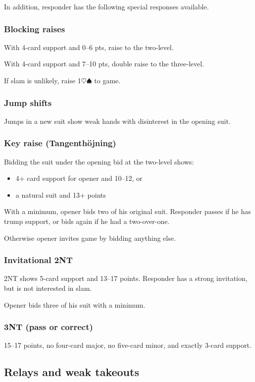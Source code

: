 \documentclass[a4paper, twoside, 11pt]{article}
\begin{document}
\begin{multicols}{3}
In addition, responder has the following special responses available.

\subsubsection*{Blocking raises}

With 4-card support and 0--6 pts, raise to the two-level.

With 4-card support and 7--10 pts, double raise to the three-level.

If slam is unlikely, raise 1$\heartsuit\spadesuit$ to game.

\subsubsection*{Jump shifts}
Jumps in a new suit show weak hands with disinterest in the opening suit.

\subsubsection*{Key raise (Tangenthöjning)}
Bidding the suit under the opening bid at the two-level shows:
\begin{itemize}
    \item 4+ card support for opener and 10--12, or
    \item a natural suit and 13+ points
\end{itemize}

With a minimum, opener bids two of his original suit. Responder passes if he has trump support, or bids again if he had a two-over-one.

Otherwise opener invites game by bidding anything else.

\subsubsection*{Invitational 2NT}
2NT shows 5-card support and 13--17 points. Responder has a strong invitation, but is not interested in slam.

Opener bids three of his suit with a minimum.

\subsubsection*{3NT (pass or correct)}
15--17 points, no four-card major, no five-card minor, and exactly 3-card support.

\subsection*{Relays and weak takeouts}


\end{multicols}
\end{document}

